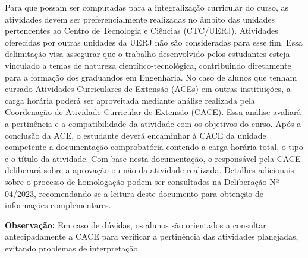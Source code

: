 Para que possam ser computadas para a integralização curricular do curso, as atividades devem ser preferencialmente realizadas no âmbito das unidades pertencentes ao Centro de Tecnologia e Ciências (CTC/UERJ). Atividades oferecidas por outras unidades da UERJ não são consideradas para esse fim. Essa delimitação visa assegurar que o trabalho desenvolvido pelos estudantes esteja vinculado a temas de natureza científico-tecnológica, contribuindo diretamente para a formação dos graduandos em Engenharia.
No caso de alunos que tenham cursado Atividades Curriculares de Extensão (ACEs) em outras instituições, a carga horária poderá ser aproveitada mediante análise realizada pela Coordenação de Atividade Curricular de Extensão (CACE). Essa análise avaliará a pertinência e a compatibilidade da atividade com os objetivos do curso.
Após a conclusão da ACE, o estudante deverá encaminhar à CACE da unidade competente a documentação comprobatória contendo a carga horária total, o tipo e o título da atividade. Com base nesta documentação, o responsável pela CACE deliberará sobre a aprovação ou não da atividade realizada. Detalhes adicionais sobre o processo de homologação podem ser consultados na Deliberação Nº 04/2023, recomendando-se a leitura deste documento para obtenção de informações complementares.

\textbf{Observação:} Em caso de dúvidas, os alunos são orientados a consultar antecipadamente a CACE para verificar a pertinência das atividades planejadas, evitando problemas de interpretação.
